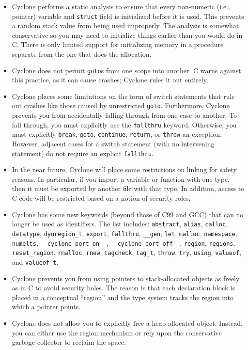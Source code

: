 \begin{itemize}
\item Cyclone performs a static analysis to ensure that every
  non-numeric (i.e., pointer) variable
  and \texttt{struct} field is initialized before it is used. This
  prevents a random stack value from being used improperly. The
  analysis is somewhat conservative so you may need to initialize
  things earlier than you would do in C\@.  There is only limited
  support for initializing memory in a procedure separate from the one
  that does the allocation.

\item Cyclone does not permit \texttt{goto}s from one scope into
  another. C warns against this practice, as it can cause crashes;
  Cyclone rules it out entirely.

\item Cyclone places some limitations on the form of switch statements
  that rule out crashes like those caused by unrestricted
  \texttt{goto}.  Furthermore, Cyclone prevents you from accidentally
  falling through from one case to another. To fall through, you must
  explicitly use the \texttt{fallthru} keyword.  Otherwise, you must
  explicitly \texttt{break}, \texttt{goto}, \texttt{continue},
  \texttt{return}, or \texttt{throw} an exception.  However, adjacent
  cases for a switch statement (with no intervening statement) do
  not require an explicit \texttt{fallthru}.

\item In the near future, Cyclone will place some restrictions on
  linking for safety reasons. In particular, if you import a variable
  or function with one type, then it must be exported by another file
  with that type. In addition, access to C code will be restricted
  based on a notion of security roles.

\item Cyclone has some new keywords (beyond those of C99 and GCC)
  that can no longer be used as identifiers.  The list includes:
  \texttt{abstract}, \texttt{alias}, \texttt{calloc}, \texttt{datatype},
  \texttt{dynregion_t}, \texttt{export}, \texttt{fallthru}, 
  \texttt{__gen}, \texttt{let}, \texttt{malloc}, \texttt{namespace},
  \texttt{numelts}, \texttt{__cyclone_port_on__}, 
  \texttt{__cyclone_port_off__}, \texttt{region}, \texttt{regions},
  \texttt{reset_region}, \texttt{rmalloc}, \texttt{rnew}, \texttt{tagcheck},
  \texttt{tag_t}, \texttt{throw}, \texttt{try}, \texttt{using},
  \texttt{valueof}, and \texttt{valueof_t}.

\item Cyclone prevents you from using pointers to stack-allocated
  objects as freely as in C to avoid security holes. The reason is
  that each declaration block is placed in a conceptual ``region'' and
  the type system tracks the region into which a pointer points.

\item Cyclone does not allow you to explicitly free a heap-allocated
  object. Instead, you can either use the region mechanism or rely
  upon the conservative garbage collector to reclaim the space.

\end{itemize}

